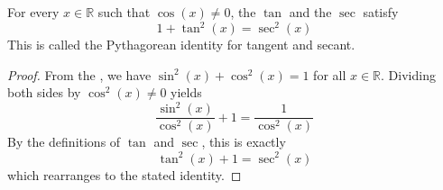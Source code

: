 \begin{proposition} \label{proposition:pythagorean_identity_for_real_tangent_and_secant_functions}
    For every $x \in \mathbb{R}$ such that $\cos(x) \neq 0$, the  $\tan$ and the  $\sec$ satisfy
    $$1 + \tan^2(x) = \sec^2(x)$$
    This is called the Pythagorean identity for tangent and secant.
\end{proposition}
\begin{proof}
    From the , we have $\sin^2(x) + \cos^2(x) = 1$ for all $x \in \mathbb{R}$. Dividing both sides by $\cos^2(x) \neq 0$ yields
    $$\frac{\sin^2(x)}{\cos^2(x)} + 1 = \frac{1}{\cos^2(x)}$$
    By the definitions of $\tan$ and $\sec$, this is exactly
    $$\tan^2(x) + 1 = \sec^2(x)$$
    which rearranges to the stated identity.
\end{proof}